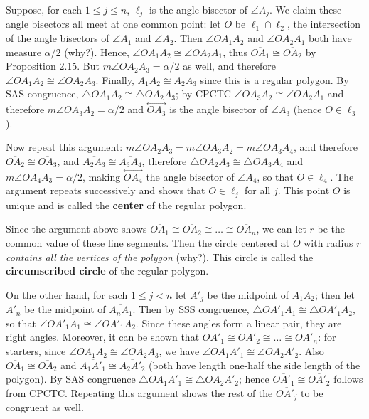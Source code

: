 \documentclass[leqno]{book}
\begin{document}
Suppose, for each $1\leqslant j\leqslant n$, $\ell_j$ is the angle bisector of $\angle A_j$.  We claim these angle bisectors all meet at one common point: let $O$ be $\ell_1\cap\ell_2$, the intersection of the angle bisectors of $\angle A_1$ and $\angle A_2$.  Then $\angle OA_1A_2$ and $\angle OA_2A_1$ both have measure $\alpha/2$ (why?).  Hence, $\angle OA_1A_2\cong\angle OA_2A_1$, thus $\overline{OA_1}\cong\overline{OA_2}$ by Proposition 2.15.  But $m\angle OA_2A_3=\alpha/2$ as well, and therefore $\angle OA_1A_2\cong\angle OA_2A_3$.  Finally, $\overline{A_1A_2}\cong\overline{A_2A_3}$ since this is a regular polygon.  By SAS congruence, $\triangle OA_1A_2\cong\triangle OA_2A_3$; by CPCTC $\angle OA_3A_2\cong\angle OA_2A_1$ and therefore $m\angle OA_3A_2=\alpha/2$ and $\overset{\longleftrightarrow}{OA_3}$ is the angle bisector of $\angle A_3$ (hence $O\in\ell_3$).

Now repeat this argument: $m\angle OA_2A_3=m\angle OA_3A_2=m\angle OA_3A_4$, and therefore $\overline{OA_2}\cong\overline{OA_3}$, and $\overline{A_2A_3}\cong\overline{A_3A_4}$, therefore $\triangle OA_2A_3\cong\triangle OA_3A_4$ and $m\angle OA_4A_3=\alpha/2$, making $\overset{\longleftrightarrow}{OA_4}$ the angle bisector of $\angle A_4$, so that $O\in\ell_4$.  The argument repeats successively and shows that $O\in\ell_j$ for all $j$.  This point $O$ is unique and is called the \textbf{center} of the regular polygon.

Since the argument above shows $\overline{OA_1}\cong\overline{OA_2}\cong\dots\cong\overline{OA_n}$, we can let $r$ be the common value of these line segments.  Then the circle centered at $O$ with radius $r$ \emph{contains all the vertices of the polygon} (why?).  This circle is called the \textbf{circumscribed circle} of the regular polygon.

On the other hand, for each $1\leqslant j<n$ let $A'_j$ be the midpoint of $\overline{A_1A_2}$; then let $A'_n$ be the midpoint of $\overline{A_nA_1}$.  Then by SSS congruence, $\triangle OA'_1A_1\cong\triangle OA'_1A_2$, so that $\angle OA'_1A_1\cong\angle OA'_1A_2$.  Since these angles form a linear pair, they are right angles.  Moreover, it can be shown that $\overline{OA'_1}\cong\overline{OA'_2}\cong\dots\cong\overline{OA'_n}$: for starters, since $\angle OA_1A_2\cong\angle OA_2A_3$, we have $\angle OA_1A'_1\cong\angle OA_2A'_2$.  Also $\overline{OA_1}\cong\overline{OA_2}$ and $\overline{A_1A'_1}\cong\overline{A_2A'_2}$ (both have length one-half the side length of the polygon).  By SAS congruence $\triangle OA_1A'_1\cong\triangle OA_2A'_2$; hence $\overline{OA'_1}\cong\overline{OA'_2}$ follows from CPCTC.  Repeating this argument shows the rest of the $\overline{OA'_j}$ to be congruent as well.
\end{document}
